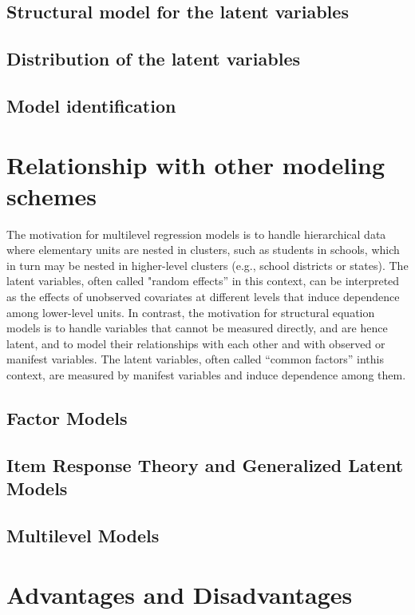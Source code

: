 \subsection{Structural model for the latent variables}

\subsection{Distribution of the latent variables}

\subsection{Model identification}


\section{Relationship with other modeling schemes}

\citet{Rabe_et_al_2012}

{\color{red} The motivation for multilevel regression models is to handle hierarchical data where elementary units are nested in clusters, such as students in schools, which in
turn may be nested in higher-level clusters (e.g., school districts or states). The latent variables, often called "random effects” in this context, can be interpreted as
the effects of unobserved covariates at different levels that induce dependence among lower-level units. In contrast, the motivation for structural equation models is to
handle variables that cannot be measured directly, and are hence latent, and to model their relationships with each other and with observed or manifest variables.
The latent variables, often called “common factors” inthis context, are measured by manifest variables and induce dependence among them.}


\subsection{Factor Models}

\subsection{Item Response Theory and Generalized Latent Models}

\subsection{Multilevel Models}



\section{Advantages and Disadvantages}